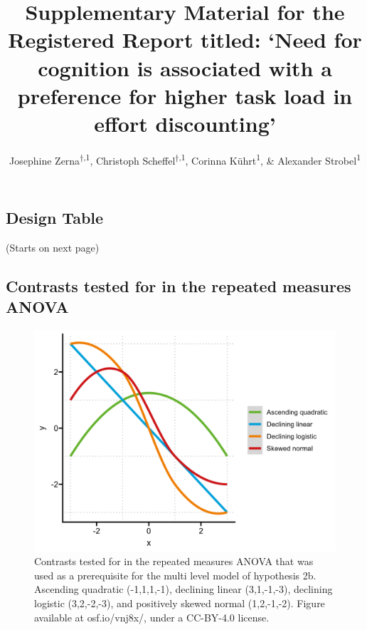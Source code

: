 \documentclass[
  man,floatsintext]{apa6}
\title{Supplementary Material for the Registered Report titled: `Need for cognition is associated with a preference for higher task load in effort discounting'}
\author{Josephine Zerna\textsuperscript{$\dagger{}$,1}, Christoph Scheffel\textsuperscript{$\dagger{}$,1}, Corinna Kührt\textsuperscript{1}, \& Alexander Strobel\textsuperscript{1}}
\date{}
\affiliation{\vspace{0.5cm}\textsuperscript{1} Faculty of Psychology, Technische Universität Dresden, 01069 Dresden, Germany}
\begin{document}
\maketitle

\newpage
\renewcommand\thesection{\Alph{section}}
\setcounter{section}{19}
\setcounter{figure}{0}
\setcounter{table}{0}

\hypertarget{design-table}{%
\subsection{Design Table}\label{design-table}}

(Starts on next page)



\newpage

\hypertarget{contrasts-tested-for-in-the-repeated-measures-anova}{%
\subsection{Contrasts tested for in the repeated measures ANOVA}\label{contrasts-tested-for-in-the-repeated-measures-anova}}

\begin{figure}[H]
\includegraphics[width=\textwidth]{Figures/contrasts} \caption{Contrasts tested for in the repeated measures ANOVA that was used as a prerequisite for the multi level model of hypothesis 2b. Ascending quadratic (-1,1,1,-1), declining linear (3,1,-1,-3), declining logistic (3,2,-2,-3), and positively skewed normal (1,2,-1,-2). Figure available at osf.io/vnj8x/, under a CC-BY-4.0 license.}\label{fig:contrast-plot}
\end{figure}
\end{document}
